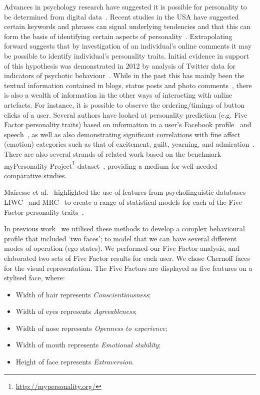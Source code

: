 \documentclass{AISB2008}
\begin{document}
Advances in psychology research have suggested it is possible for
personality to be determined from digital
data~\cite{pennebaker+king:1999,vazire+gosling:2004,iacobelli-et-al:2011}.
Recent studies in the USA have suggested certain keywords and phrases
can signal underlying tendencies and that this can form the basis of
identifying certain aspects of
personality~\cite{woodworth-et-al:2012}.  Extrapolating forward
suggests that by investigation of an individual's online comments it
may be possible to identify individual's personality traits. Initial
evidence in support of this hypothesis was demonstrated in 2012 by
analysis of Twitter data for indicators of psychotic
behaviour~\cite{sumner-et-al:2012}. While in the past this has mainly
been the textual information contained in blogs, status posts and
photo comments~\cite{blamey-et-al-2012,blamey-et-al-2013}, there is
also a wealth of information in the other ways of interacting with
online artefacts. For instance, it is possible to observe the
ordering/timings of button clicks of a user. Several authors have
looked at personality prediction (e.g. Five Factor personality traits)
based on information in a user's Facebook
profile~\cite{back-et-al:2010,golbeck-et-al:2001} and
speech~\cite{chung+pennebaker:2007,tausczik+pennebaker:2010}, as well
as also demonstrating significant correlations with fine affect
(emotion) categories such as that of excitement, guilt, yearning, and
admiration~\cite{mohammad+kiritchenko:2013}. There are also several
strands of related work based on the benchmark myPersonality
Project\footnote{\url{http://mypersonality.org/}}
dataset~\cite{celli-et-al:2013}, providing a medium for well-needed
comparative studies.

Mairesse et al.~\cite{mairesse-et-al:2007} highlighted the use of
features from psycholinguistic databases
LIWC~\cite{pennebaker-et-al:2001} and MRC~\cite{wilson:1988} to create
a range of statistical models for each of the Five Factor personality
traits~\cite{norman:1963,peabody+goldberg:1989}.

In previous work~\cite{oatley+crick:2014} we utilised these methods to
develop a complex behavioural profile that included `two faces'; to
model that we can have several different modes of operation (ego
states). We performed our Five Factor analysis, and elaborated two
sets of Five Factor results for each user. We chose Chernoff
faces~\cite{chernoff:1973} for the visual representation. The Five
Factors are displayed as five features on a stylised face, where:

\begin{itemize}
\item Width of hair represents {\emph{Conscientiousness}}; 
\item Width of eyes represents {\emph{Agreeableness}};
\item Width of nose represents {\emph{Openness to experience}}; 
\item Width of mouth represents {\emph{Emotional stability}};
\item Height of face represents {\emph{Extraversion}}.
\end{itemize}
\end{document}
